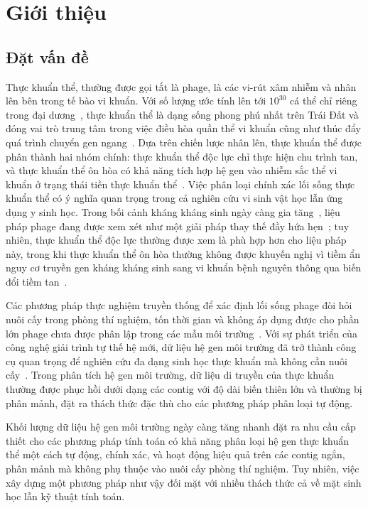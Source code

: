 \chapter{Giới thiệu}
\label{chap:introduction}

\section{Đặt vấn đề}
\label{sec:background}

Thực khuẩn thể, thường được gọi tắt là phage, là các vi-rút xâm nhiễm và nhân lên bên trong tế bào vi khuẩn. Với số lượng ước tính lên tới $10^{30}$ cá thể chỉ riêng trong đại dương~\cite{suttle2007marine}, thực khuẩn thể là dạng sống phong phú nhất trên Trái Đất và đóng vai trò trung tâm trong việc điều hòa quần thể vi khuẩn cũng như thúc đẩy quá trình chuyển gen ngang~\cite{chevallereau2022interactions}. Dựa trên chiến lược nhân lên, thực khuẩn thể được phân thành hai nhóm chính: thực khuẩn thể độc lực chỉ thực hiện chu trình tan, và thực khuẩn thể ôn hòa có khả năng tích hợp hệ gen vào nhiễm sắc thể vi khuẩn ở trạng thái tiền thực khuẩn thể~\cite{howard2017lysogeny,rostol2026revisiting}. Việc phân loại chính xác lối sống thực khuẩn thể có ý nghĩa quan trọng trong cả nghiên cứu vi sinh vật học lẫn ứng dụng y sinh học. Trong bối cảnh kháng kháng sinh ngày càng gia tăng~\cite{murray2022amr,naghavi2024amr}, liệu pháp phage đang được xem xét như một giải pháp thay thế đầy hứa hẹn~\cite{strathdee2023phage}; tuy nhiên, thực khuẩn thể độc lực thường được xem là phù hợp hơn cho liệu pháp này, trong khi thực khuẩn thể ôn hòa thường không được khuyến nghị vì tiềm ẩn nguy cơ truyền gen kháng kháng sinh sang vi khuẩn bệnh nguyên thông qua biến đổi tiềm tan~\cite{gummalla2023temperate,strathdee2023phage}.

Các phương pháp thực nghiệm truyền thống để xác định lối sống phage đòi hỏi nuôi cấy trong phòng thí nghiệm, tốn thời gian và không áp dụng được cho phần lớn phage chưa được phân lập trong các mẫu môi trường~\cite{shang2023phatyp}. Với sự phát triển của công nghệ giải trình tự thế hệ mới, dữ liệu hệ gen môi trường đã trở thành công cụ quan trọng để nghiên cứu đa dạng sinh học thực khuẩn mà không cần nuôi cấy~\cite{sommers2021integrating}. Trong phân tích hệ gen môi trường, dữ liệu di truyền của thực khuẩn thường được phục hồi dưới dạng các contig với độ dài biến thiên lớn và thường bị phân mảnh, đặt ra thách thức đặc thù cho các phương pháp phân loại tự động.

Khối lượng dữ liệu hệ gen môi trường ngày càng tăng nhanh đặt ra nhu cầu cấp thiết cho các phương pháp tính toán có khả năng phân loại hệ gen thực khuẩn thể một cách tự động, chính xác, và hoạt động hiệu quả trên các contig ngắn, phân mảnh mà không phụ thuộc vào nuôi cấy phòng thí nghiệm. Tuy nhiên, việc xây dựng một phương pháp như vậy đối mặt với nhiều thách thức cả về mặt sinh học lẫn kỹ thuật tính toán.

